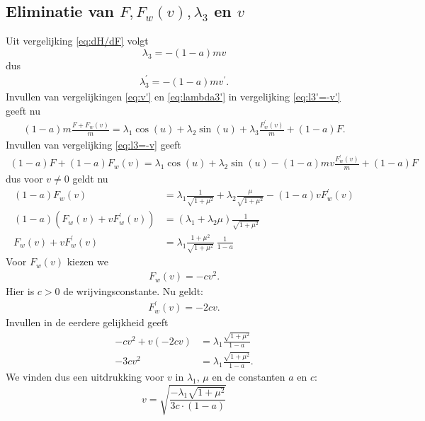 \subsection{Eliminatie van \(F, F_w(v),\lambda_3\) en \(v\)}
Uit vergelijking \eqref{eq:dH/dF} volgt
\begin{equation}
	\lambda_3=-(1-a)mv \label{eq:l3=-v}
\end{equation}
dus
\begin{align}
	\lambda_3^\prime =-(1-a)mv^\prime. \label{eq:l3'=-v'}
\end{align}
Invullen van vergelijkingen \eqref{eq:v'} en \eqref{eq:lambda3'} in vergelijking \eqref{eq:l3'=-v'} geeft nu
\begin{align*}
	(1-a)m\frac{F + F_w(v)}{m} = \lambda_1 \cos(u)+\lambda_2 \sin (u) +\lambda_3 \frac{F_w^\prime (v)}{m} +(1-a)F.
\end{align*} 
Invullen van vergelijking \eqref{eq:l3=-v} geeft
\begin{align*}
	(1-a)F + (1-a)F_w(v) = \lambda_1 \cos(u)+\lambda_2 \sin (u) -(1-a)mv\frac{F_w^\prime (v)}{m} +(1-a)F
\end{align*}	  
dus voor \(v\neq 0\) geldt nu
\begin{align*}
	(1-a)F_w(v) &= \lambda_1 \frac{1}{\sqrt{1+\mu^2}}+\lambda_2 \frac{\mu}{\sqrt{1+\mu^2}} -(1-a)v F_w^\prime (v)\\
	(1-a)(F_w(v) + v F_w^\prime (v)) &= (\lambda_1+\lambda_2\mu)\frac{1}{\sqrt{1+ \mu^2}}\\
	F_w(v) + v F_w^\prime (v) &= \lambda_1 \frac{1+\mu^2}{\sqrt{1+\mu^2}}~\frac{1}{1-a}
\end{align*}
Voor \(F_w (v)\) kiezen we
\begin{align}
	F_w (v) = -cv^2.
\end{align}	 
Hier is \(c>0\) de wrijvingsconstante. Nu geldt:
\begin{align}
	F_w^\prime (v) = -2cv.
\end{align}
Invullen in de eerdere gelijkheid geeft
\begin{align*}
	-cv^2 + v(-2cv) &= \lambda_1\frac{\sqrt{1+\mu^2}}{1-a}\\
	-3cv^2 &= \lambda_1\frac{\sqrt{1+\mu^2}}{1-a}.
\end{align*}
We vinden dus een uitdrukking voor \(v\) in \(\lambda_1\),  \(\mu\) en de constanten \(a\) en \(c\):
\begin{equation}
	v = \sqrt{\frac{-\lambda_1\sqrt{1+\mu^2}}{3c\cdot(1-a)}} \label{eq:Vwaarde}
\end{equation}

